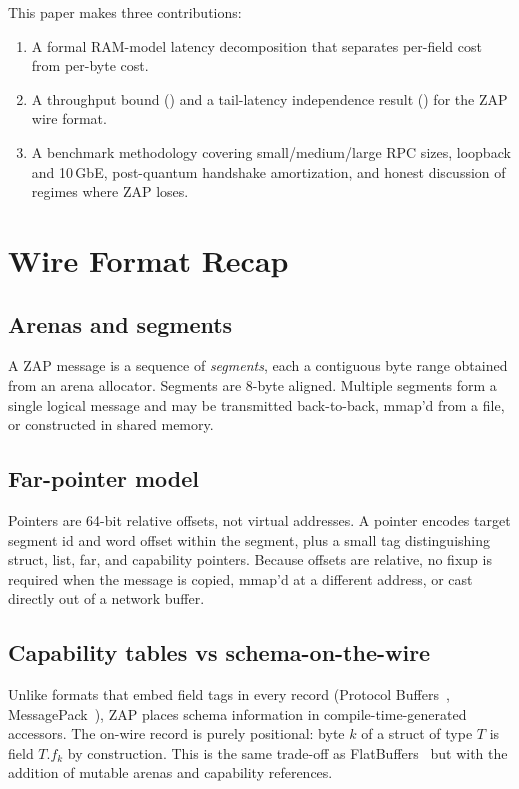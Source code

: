 \documentclass[11pt]{article}
\theoremstyle{definition}
\theoremstyle{remark}
\begin{document}
This paper makes three contributions:
\begin{enumerate}
  \item A formal RAM-model latency decomposition that separates
        per-field cost from per-byte cost.
  \item A throughput bound () and a tail-latency
        independence result () for the ZAP wire format.
  \item A benchmark methodology covering small/medium/large RPC sizes,
        loopback and 10\,GbE, post-quantum handshake amortization, and
        honest discussion of regimes where ZAP loses.
\end{enumerate}

\section{Wire Format Recap}
\label{sec:wire}

\subsection{Arenas and segments}
A ZAP message is a sequence of \emph{segments}, each a contiguous byte
range obtained from an arena allocator. Segments are 8-byte aligned.
Multiple segments form a single logical message and may be transmitted
back-to-back, mmap'd from a file, or constructed in shared memory.

\subsection{Far-pointer model}
Pointers are 64-bit relative offsets, not virtual addresses. A pointer
encodes target segment id and word offset within the segment, plus a
small tag distinguishing struct, list, far, and capability pointers.
Because offsets are relative, no fixup is required when the message is
copied, mmap'd at a different address, or cast directly out of a
network buffer.

\subsection{Capability tables vs schema-on-the-wire}
Unlike formats that embed field tags in every record (Protocol
Buffers~\cite{protobuf}, MessagePack~\cite{msgpack}), ZAP places
schema information in compile-time-generated accessors. The on-wire
record is purely positional: byte $k$ of a struct of type $T$ is
field $T.f_k$ by construction. This is the same trade-off as
FlatBuffers~\cite{flatbuffers} but with the addition of mutable
arenas and capability references.
\end{document}
